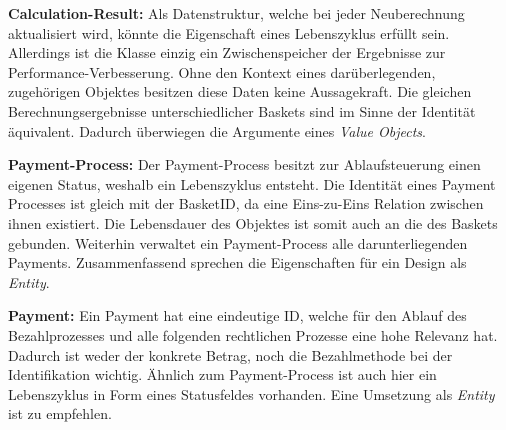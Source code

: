 \textbf{Calculation-Result: } {Als Datenstruktur, welche bei jeder Neuberechnung aktualisiert wird, könnte die Eigenschaft eines Lebenszyklus erfüllt sein. Allerdings ist die Klasse einzig ein Zwischenspeicher der Ergebnisse zur Performance-Verbesserung. Ohne den Kontext eines darüberlegenden, zugehörigen Objektes besitzen diese Daten keine Aussagekraft. Die gleichen Berechnungsergebnisse unterschiedlicher Baskets sind im Sinne der Identität äquivalent. Dadurch überwiegen die Argumente eines \emph{Value Objects}.}

\textbf{Payment-Process: } {Der Payment-Process besitzt zur Ablaufsteuerung einen eigenen Status, weshalb ein Lebenszyklus entsteht. Die Identität eines Payment Processes ist gleich mit der BasketID, da eine Eins-zu-Eins Relation zwischen ihnen existiert. Die Lebensdauer des Objektes ist somit auch an die des Baskets gebunden. Weiterhin verwaltet ein Payment-Process alle darunterliegenden Payments. Zusammenfassend sprechen die Eigenschaften für ein Design als \emph{Entity}.}

\textbf{Payment: } {Ein Payment hat eine eindeutige ID, welche für den Ablauf des Bezahlprozesses und alle folgenden rechtlichen Prozesse eine hohe Relevanz hat. Dadurch ist weder der konkrete Betrag, noch die Bezahlmethode bei der Identifikation wichtig. Ähnlich zum Payment-Process ist auch hier ein Lebenszyklus in Form eines Statusfeldes vorhanden. Eine Umsetzung als \emph{Entity} ist zu empfehlen.}



